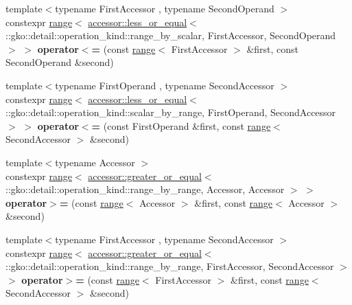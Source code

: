 \begin{DoxyCompactItemize}
\item 
\mbox{\label{namespacegko_ab59c44515b0155c808f9d77b5d430cac}} 
{\footnotesize template$<$typename First\+Accessor , typename Second\+Operand $>$ }\\constexpr \hyperlink{classgko_1_1range}{range}$<$ \hyperlink{structgko_1_1accessor_1_1less__or__equal}{accessor\+::less\+\_\+or\+\_\+equal}$<$ \+::gko\+::detail\+::operation\+\_\+kind\+::range\+\_\+by\+\_\+scalar, First\+Accessor, Second\+Operand $>$ $>$ {\bfseries operator$<$=} (const \hyperlink{classgko_1_1range}{range}$<$ First\+Accessor $>$ \&first, const Second\+Operand \&second)
\item 
\mbox{\label{namespacegko_a1165979d19164d7762c6fdf560bf1b15}} 
{\footnotesize template$<$typename First\+Operand , typename Second\+Accessor $>$ }\\constexpr \hyperlink{classgko_1_1range}{range}$<$ \hyperlink{structgko_1_1accessor_1_1less__or__equal}{accessor\+::less\+\_\+or\+\_\+equal}$<$ \+::gko\+::detail\+::operation\+\_\+kind\+::scalar\+\_\+by\+\_\+range, First\+Operand, Second\+Accessor $>$ $>$ {\bfseries operator$<$=} (const First\+Operand \&first, const \hyperlink{classgko_1_1range}{range}$<$ Second\+Accessor $>$ \&second)
\item 
\mbox{\label{namespacegko_a323744fe971b1e322b0adde873ee6fc6}} 
{\footnotesize template$<$typename Accessor $>$ }\\constexpr \hyperlink{classgko_1_1range}{range}$<$ \hyperlink{structgko_1_1accessor_1_1greater__or__equal}{accessor\+::greater\+\_\+or\+\_\+equal}$<$ \+::gko\+::detail\+::operation\+\_\+kind\+::range\+\_\+by\+\_\+range, Accessor, Accessor $>$ $>$ {\bfseries operator$>$=} (const \hyperlink{classgko_1_1range}{range}$<$ Accessor $>$ \&first, const \hyperlink{classgko_1_1range}{range}$<$ Accessor $>$ \&second)
\item 
\mbox{\label{namespacegko_a9aaf424ba6928e394060e3daee3ec841}} 
{\footnotesize template$<$typename First\+Accessor , typename Second\+Accessor $>$ }\\constexpr \hyperlink{classgko_1_1range}{range}$<$ \hyperlink{structgko_1_1accessor_1_1greater__or__equal}{accessor\+::greater\+\_\+or\+\_\+equal}$<$ \+::gko\+::detail\+::operation\+\_\+kind\+::range\+\_\+by\+\_\+range, First\+Accessor, Second\+Accessor $>$ $>$ {\bfseries operator$>$=} (const \hyperlink{classgko_1_1range}{range}$<$ First\+Accessor $>$ \&first, const \hyperlink{classgko_1_1range}{range}$<$ Second\+Accessor $>$ \&second)

\end{DoxyCompactItemize}

